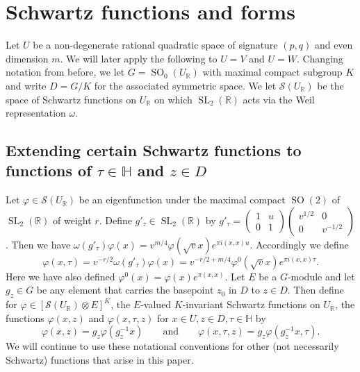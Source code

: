\documentclass[12pt,leqno]{amsart}
\numberwithin{equation}{section}
\theoremstyle{plain}
\theoremstyle{definition}
\theoremstyle{remark}
\newcommand{\R}{\mathbb{R}}
\newcommand{\h}{\mathbb{H}}
\newcommand{\calS}{\mathcal{S}}
\newcommand{\SL}{\operatorname{SL}}
\newcommand{\SO}{\operatorname{SO}}
\begin{document}
\section{Schwartz functions and forms}

Let $U$ be a non-degenerate rational quadratic space of  signature $(p,q)$ and even dimension $m$. We will later apply the following to $U=V$ and $U=W$. Changing notation from before, we let $G = \SO_0(U_{\R})$ with maximal compact subgroup $K$ and write $D=G/K$ for the associated symmetric space. We let $\calS(U_{\R})$ be the space of Schwartz functions on $U_{\R}$ on which $\SL_2(\R)$ acts via the Weil representation $\omega$.

\subsection{Extending certain Schwartz functions to functions of $\tau \in \h$ and $z\in D$}\label{conventions}

Let $\varphi \in \calS(U_{\R})$ be an eigenfunction under the maximal compact $\SO(2)$ of $\SL_2(\R)$ of
weight $r$. Define $g'_{\tau} \in \SL_2(\R)$
by $g'_{\tau} = \left(
\begin{smallmatrix}1&u\\0&1\end{smallmatrix} \right) \left(
\begin{smallmatrix}v^{1/2}&0\\0&v^{-1/2}\end{smallmatrix} \right)$.
Then we have $ \omega(g'_{\tau}) \varphi (x)= v^{m/4} \varphi(\sqrt{v}x) e^{\pi i (x,x)u}$.
Accordingly we define 
\begin{equation}\label{group-tau}
\varphi(x,\tau)  = v^{-r/2} \omega(g'_{\tau}) \varphi
(x)  = v^{-r/2+m/4} \varphi^0(\sqrt{v}x) e^{\pi i (x,x)\tau}.
\end{equation}
Here we have also defined $\varphi^0(x) = \varphi(x) e^{\pi (x,x)}$. Let $E$ be a $G$-module and let $g_z \in G$ be any element that carries the basepoint $z_0$ in $D$ to $z \in D$. Then define for $\varphi \in [\calS(U_{\R}) \otimes E]^K$, the $E$-valued $K$-invariant Schwartz functions on $U_{\R}$, the functions $\varphi(x,z)$ and $\varphi(x,\tau,z)$ for $x \in U, z \in D, \tau \in \mathbb{H}$ by
\[
\varphi(x,z) =g_z \varphi(g_z^{-1}x) \qquad  \text{and} \qquad  \varphi(x,\tau,z) = g_z\varphi(g_z^{-1}x,\tau).
\]
We will continue to use these notational conventions for other (not necessarily Schwartz) functions that arise in this paper.
\end{document}
